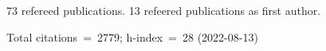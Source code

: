 73 refereed publications. 13 refeered publications as first author.

Total citations~=~2779; h-index~=~28 (2022-08-13)